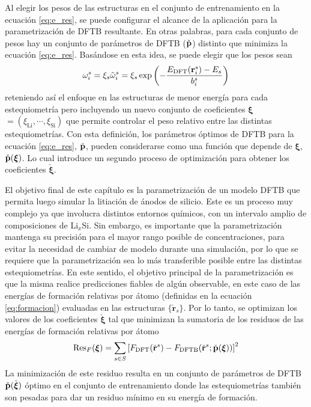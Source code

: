 Al elegir los pesos de las estructuras en el conjunto de entrenamiento en la 
ecuación \ref{eq:e_res}, se puede configurar el alcance de la aplicación para 
la parametrización de DFTB resultante. En otras palabras, para cada conjunto de 
pesos hay un conjunto de parámetros de DFTB ($\check{{\bf p}}$) distinto que 
minimiza la ecuación \ref{eq:e_res}. Basándose en esta idea, se puede elegir que 
los pesos sean
\begin{equation}\label{eq:omega2}
      \omega^s_i=\xi_s\tilde\omega^s_i=\xi_s\exp\left(-\frac{E_\text{DFT}({\bf r}^s_i)-E_s}{b^s_i}\right)
\end{equation} 
reteniendo así el enfoque en las estructuras de menor energía para cada 
estequiometría pero incluyendo un nuevo conjunto de coeficientes 
$\boldsymbol{\xi}$ $=\left(\xi_{\text{Li}},\cdots,\xi_{\text{Si}}\right)$ que 
permite controlar el peso relativo entre las distintas estequiometrías. Con esta 
definición, los parámetros óptimos de DFTB para la ecuación \ref{eq:e_res},
$\check{{\bf p}}$, pueden considerarse como una función que depende de 
$\boldsymbol{\xi}$, $\check{{\bf p}}(\boldsymbol{\xi})$. Lo cual 
introduce un segundo proceso de optimización para obtener los coeficientes 
$\check{\boldsymbol{\xi}}$.

El objetivo final de este capítulo es la parametrización de un modelo DFTB que 
permita luego simular la litiación de ánodos de silicio. Este es un proceso muy 
complejo ya que involucra distintos entornos químicos, con un intervalo amplio de
composiciones de Li$_x$Si. Sin embargo, es importante que la parametrización
mantenga su precisión para el mayor rango posible de concentraciones, para evitar 
la necesidad de cambiar de modelo  durante una simulación,
por lo que se requiere que la parametrización sea lo más transferible posible 
entre las distintas estequiometrías. En este sentido, el objetivo principal de la 
parametrización es que la misma realice predicciones fiables de algún observable, 
en este caso de las energías de formación relativas por átomo (definidas en la 
ecuación \ref{eq:formacion}) evaluadas en las estructuras 
$\lbrace \check{\mathbf{r}}_s \rbrace$. Por lo tanto, se 
optimizan los valores de los coeficientes $\check{\boldsymbol{\xi}}$ tal que 
minimizan la sumatoria de los residuos de las energías de formación relativas por 
átomo
\begin{equation}\label{eq:fres}
    \text{Res}_F(\boldsymbol{\xi}) = \sum_{s\in S} \left[F_\text{DFT}(\check{{\bf r}}^s)-F_\text{DFTB}(\check{{\bf r}}^s;\check{{\bf p}}({\boldsymbol{\xi}}))\right]^2
\end{equation}
La minimización de este residuo resulta en un conjunto de parámetros de DFTB
$\check{{\bf p}}(\check{\boldsymbol{\xi}})$ óptimo en el conjunto de 
entrenamiento donde las estequiometrías también son pesadas para dar un residuo
mínimo en su energía de formación.

